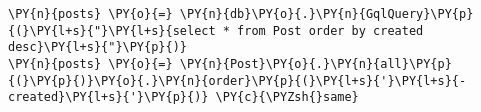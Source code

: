 \begin{Verbatim}[commandchars=\\\{\}]
\PY{n}{posts} \PY{o}{=} \PY{n}{db}\PY{o}{.}\PY{n}{GqlQuery}\PY{p}{(}\PY{l+s}{"}\PY{l+s}{select * from Post order by created desc}\PY{l+s}{"}\PY{p}{)}
\PY{n}{posts} \PY{o}{=} \PY{n}{Post}\PY{o}{.}\PY{n}{all}\PY{p}{(}\PY{p}{)}\PY{o}{.}\PY{n}{order}\PY{p}{(}\PY{l+s}{'}\PY{l+s}{-created}\PY{l+s}{'}\PY{p}{)} \PY{c}{\PYZsh{}same}
\end{Verbatim}
